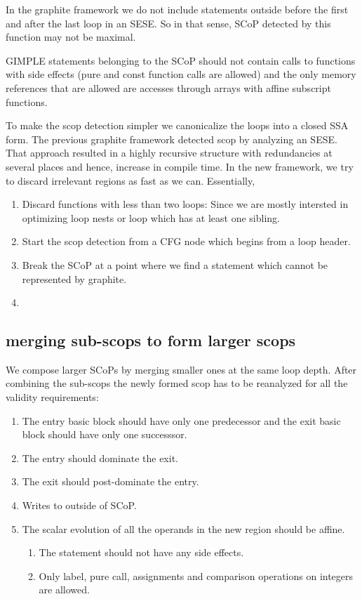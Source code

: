 \documentclass{sigplanconf}
\begin{document}
In the graphite framework we do not include statements outside before the first and after the last loop in an SESE.
So in that sense, SCoP detected by this function may not be maximal.

GIMPLE statements belonging to the SCoP should not contain calls to functions with
side effects (pure and const function calls are allowed) and the only memory references
that are allowed are accesses through arrays with affine subscript functions.

To make the scop detection simpler we canonicalize the loops into a closed SSA form.
The previous graphite framework detected scop by analyzing an SESE. That approach resulted in a highly recursive structure
with redundancies at several places and hence, increase in compile time. In the new framework, we try to discard irrelevant
regions as fast as we can. Essentially,
\begin{enumerate}
\item Discard functions with less than two loops: Since we are mostly intersted in optimizing loop nests
or loop which has at least one sibling.
\item Start the scop detection from a CFG node which begins from a loop header.
\item Break the SCoP at a point where we find a statement which cannot be represented by graphite.
\item 
\end{enumerate}


\subsection{merging sub-scops to form larger scops}
We compose larger SCoPs by merging smaller ones at the same loop depth. After combining the sub-scops
the newly formed scop has to be reanalyzed for all the validity requirements:
\begin{enumerate}
  \item The entry basic block should have only one predecessor and the exit basic block should have only one
    successsor.
  \item The entry should dominate the exit.
  \item The exit should post-dominate the entry.
  \item Writes to outside of SCoP.
  \item The scalar evolution of all the operands in the new region should be affine.

    \begin{enumerate}
      \item The statement should not have any side effects.
      \item Only label, pure call, assignments and comparison operations on integers are allowed.
    \end{enumerate}
\end{enumerate}
\end{document}
